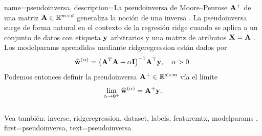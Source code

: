 

{name={pseudoinversa},
  description={La pseudoinversa de Moore–Penrose ${\bf A}^{+}$ 
  de una matriz ${\bf A} \in \mathbb{R}^{m \times d}$ generaliza la 
  noción de una inversa \cite{GolubVanLoanBook}. La pseudoinversa surge de forma natural 
  en el contexto de la regresión ridge cuando se aplica a un conjunto de datos con etiqueta ${\bf y}$ 
  arbitrarios y una matriz de atributos ${\bf X} = {\bf A}$ \cite[Cap.\ 3]{hastie01statisticallearning}. 
  Los \gls{modelparams} aprendidos mediante \gls{ridgeregression} están dados por
  	\[
  	\widehat{{\bf w}}^{(\alpha)}  = \big({\bf A}^T {\bf A} + \alpha \mathbf{I} \big)^{-1} {\bf A}^\top {\bf y}, \quad \alpha > 0.
  	\]
  	Podemos entonces definir la pseudoinversa ${\bf A}^+ \in \mathbb{R}^{d \times m}$ vía 
  	el límite \cite[Cap. 3]{benisrael2003generalized}
  	\[
  	\lim_{\alpha \to 0^+} \widehat{{\bf w}}^{(\alpha)} = {\bf A}^+ {\bf y}.
  	\]
	  \\
	  Vea también: \gls{inverse}, \gls{ridgeregression}, \gls{dataset}, \glspl{label}, \gls{featuremtx}, \gls{modelparams} },
 	first={pseudoinversa},
 	text={pseudoinversa}
 }

